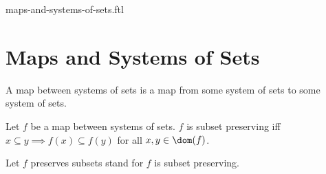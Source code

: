 \documentclass{naproche-library}
\begin{document}
\begin{smodule}{maps-and-systems-of-sets.ftl}

  \section*{Maps and Systems of Sets}

  \begin{definition}[forthel,id=FOUNDATIONS_10_1394550966845440,printid]
    A map between systems of sets is a map from some system of sets to some system of sets.
  \end{definition}

  \begin{definition}[forthel,id=FOUNDATIONS_10_3290499861446656,printid]
    Let $f$ be a map between systems of sets.
    $f$ is subset preserving iff $x \subseteq y \implies f(x) \subseteq f(y)$ for all $x, y \in \dom(f)$.

    Let $f$ preserves subsets stand for $f$ is subset preserving.
  \end{definition}
\end{smodule}
\end{document}

